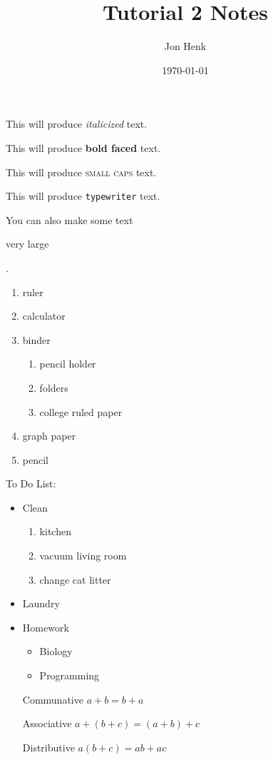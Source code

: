 \documentclass[12pt]{article}
\begin{document}
\title{Tutorial 2 Notes}
\author{Jon Henk}
\date{\today}
\maketitle

This will produce \textit{italicized} text.

This will produce \textbf{bold faced} text.

\begin{center}This will produce \textsc{small caps} text.\end{center}

\begin{flushright}This will produce \texttt{typewriter} text.\end{flushright}

\begin{flushleft}
 You can also make some text \begin{large}very large\end{large}.
\end{flushleft}


\begin{enumerate}
\item ruler
\item calculator
\item binder
	\begin{enumerate}
	\item pencil holder
	\item folders
	\item college ruled paper
	\end{enumerate}
\item graph paper
\item pencil
\end{enumerate}

To Do List:

\begin{itemize}
\item Clean
	\begin{enumerate}
	\item kitchen
	\item vacuum living room
	\item change cat litter
	\end{enumerate}
\item Laundry
\item Homework
	\begin{itemize}
	\item Biology
	\item Programming
	\end{itemize}
\end{itemize}


\begin{enumerate}
\item[Communative] $a+b=b+a$
\item[Associative] $a+(b+c)=(a+b)+c$
\item[Distributive] $a(b+c)=ab+ac$
\end{enumerate}
\end{document}
